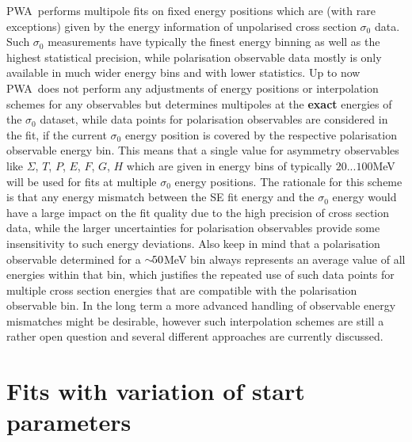 \documentclass[a4paper,10pt]{article}
\def\PWA{\ttfamily PWA\rmfamily\ }
\begin{document}
\PWA performs multipole fits on fixed energy positions which are (with rare exceptions) given by the energy information of
unpolarised cross section $\sigma_0$ data. Such $\sigma_0$ measurements have typically the finest energy binning as well as
the highest statistical precision, while polarisation observable data mostly is only available in much wider energy bins and
with lower statistics.
Up to now \PWA does not perform any adjustments of energy positions or interpolation schemes for any observables
but determines multipoles at the \textbf{exact} energies of the $\sigma_0$ dataset, while data points for 
polarisation observables are considered in the fit, if the current $\sigma_0$ energy position is covered
by the respective polarisation observable energy bin. This means that a single value for asymmetry observables like
$\Sigma$, $T$, $P$, $E$, $F$, $G$, $H$ which are given in energy bins of typically $20...100$\:MeV will be used
for fits at multiple $\sigma_0$ energy positions.
The rationale for this scheme is that any energy mismatch between the SE fit energy and the $\sigma_0$ energy
would have a large impact on the fit quality due to the high precision of cross section data, while 
the larger uncertainties for polarisation observables provide some insensitivity to such energy deviations.
Also keep in mind that a polarisation observable determined for a $\sim\hspace{-0.4em}50$\:MeV bin always represents an average
value of all energies within that bin, which justifies the repeated use of such data points for multiple
cross section energies that are compatible with the polarisation observable bin.
In the long term a more advanced handling of observable energy mismatches might be desirable,
however such interpolation schemes are still a rather open question and several different approaches 
are currently discussed.

\section{Fits with variation of start parameters}
\end{document}
